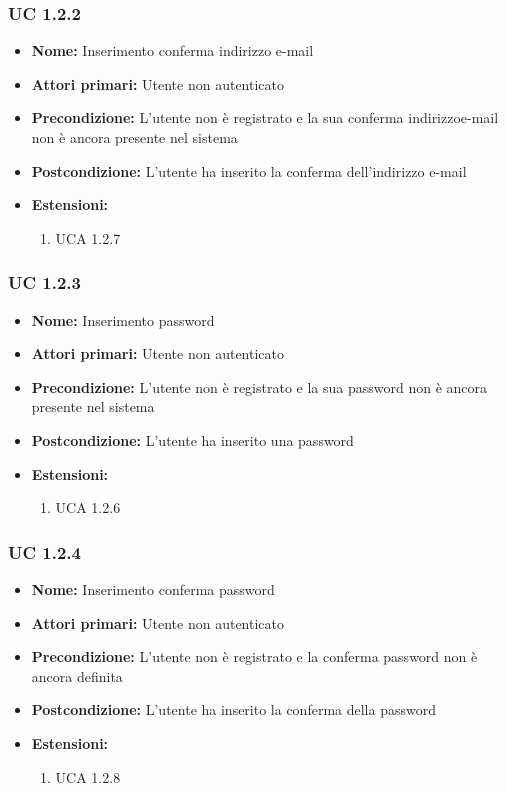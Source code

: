 \documentclass[a4paper, oneside, dvipsnames, table]{article} %
\begin{document}
\subsubsection{UC 1.2.2}%
\begin{itemize}
\item \textbf{Nome:} Inserimento conferma indirizzo e-mail
\item \textbf{Attori primari:} Utente non autenticato
\item \textbf{Precondizione:} L’utente non è registrato e la sua conferma indirizzoe-mail non è ancora presente nel sistema
\item \textbf{Postcondizione:}  L’utente ha inserito la conferma dell'indirizzo e-mail
\item \textbf{Estensioni:}
	\begin{enumerate}
		\item UCA 1.2.7
	\end{enumerate} 
\end{itemize}


\subsubsection{UC 1.2.3}%
\begin{itemize}
\item \textbf{Nome:} Inserimento password
\item \textbf{Attori primari:} Utente non autenticato
\item \textbf{Precondizione:} L’utente non è registrato e la sua password non è ancora presente nel sistema
\item \textbf{Postcondizione:} L’utente ha inserito una password
\item \textbf{Estensioni:}
	\begin{enumerate}
		\item UCA 1.2.6 
	\end{enumerate}
\end{itemize}

\subsubsection{UC 1.2.4}%
\begin{itemize}
\item \textbf{Nome:} Inserimento conferma password
\item \textbf{Attori primari:} Utente non autenticato
\item \textbf{Precondizione:} L’utente non è registrato  e la conferma password non è ancora definita
\item \textbf{Postcondizione:} L’utente ha inserito la conferma della password
\item \textbf{Estensioni:}
	\begin{enumerate}
		\item UCA 1.2.8
	\end{enumerate}
\end{itemize}
\end{document}
